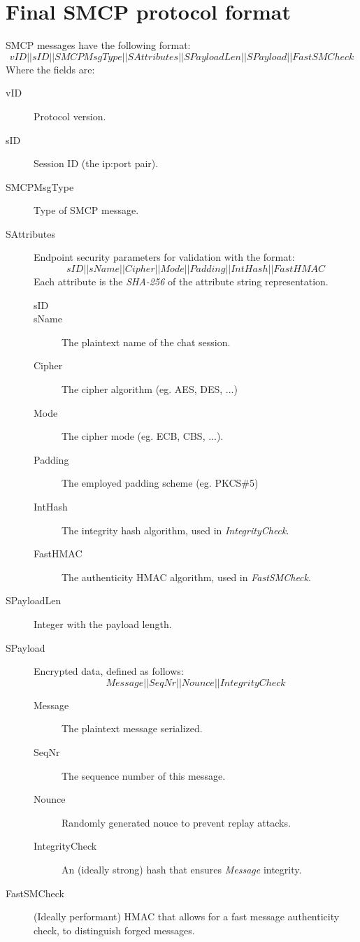 \documentclass[runningheads]{llncs}
\begin{document}
\section{Final SMCP protocol format}
SMCP messages have the following format:
$$vID||sID||SMCPMsgType||SAttributes||SPayloadLen||SPayload||FastSMCheck$$
Where the fields are:
\begin{description}
	\item[vID] Protocol version.
	\item[sID] Session ID (the ip:port pair).
	\item[SMCPMsgType] Type of SMCP message.
	\item[SAttributes] Endpoint security parameters for validation with the format:
	$$sID||sName||Cipher||Mode||Padding||IntHash||FastHMAC$$
	Each attribute is the \textit{SHA-256} of the attribute string representation.
	\begin{description}
		\item[sID]
		\item[sName] The plaintext name of the chat session.
		\item[Cipher] The cipher algorithm (eg. AES, DES, ...)
		\item[Mode] The cipher mode (eg. ECB, CBS, ...).
		\item[Padding] The employed padding scheme (eg. PKCS\#5)
		\item[IntHash] The integrity hash algorithm, used in \textit{IntegrityCheck}.
		\item[FastHMAC] The authenticity HMAC algorithm, used in \textit{FastSMCheck}.\\
	\end{description}
	\item[SPayloadLen] Integer with the payload length.
	\item[SPayload] Encrypted data, defined as follows:
	$$ Message||SeqNr||Nounce||IntegrityCheck$$
	\begin{description}
		\item[Message] The plaintext message serialized.
		\item[SeqNr] The sequence number of this message.
		\item[Nounce] Randomly generated nouce to prevent replay attacks.
		\item[IntegrityCheck] An (ideally strong) hash that ensures \textit{Message} integrity.\\
	\end{description}
	\item[FastSMCheck] (Ideally performant) HMAC that allows for a fast message authenticity check, to distinguish forged messages.
\end{description}
\end{document}
